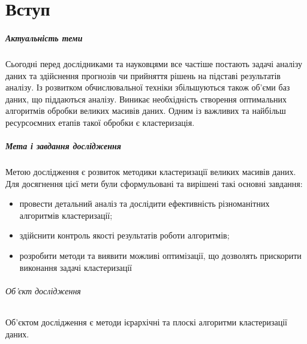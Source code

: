 \chapter*{Вступ}

\paragraph{Актуальність теми}

Сьогодні перед дослідниками та науковцями все частіше постають задачі аналізу даних та здійснення прогнозів чи прийняття рішень на підставі результатів аналізу. Із розвитком обчислювальної техніки збільшуються також об'єми баз даних, що піддаються аналізу. Виникає необхідність створення оптимальних алгоритмів обробки великих масивів даних.
Одним із важливих та найбільш ресурсоємних етапів такої обробки є кластеризація.

\paragraph{Мета і завдання дослідження}

Метою дослідження є розвиток методики кластеризації великих масивів даних.
Для досягнення цієї мети були сформульовані та вирішені такі основні завдання:
\begin{itemize}
    \item провести детальний аналіз та дослідити ефективність різноманітних алгоритмів кластеризації;
    \item здійснити контроль якості результатів роботи алгоритмів;
    \item розробити методи та виявити можливі оптимізації, що дозволять прискорити виконання задачі кластеризації
\end{itemize}

\subparagraph{Об'єкт дослідження}
Об'єктом дослідження є методи ієрархічні та плоскі алгоритми кластеризації даних.
